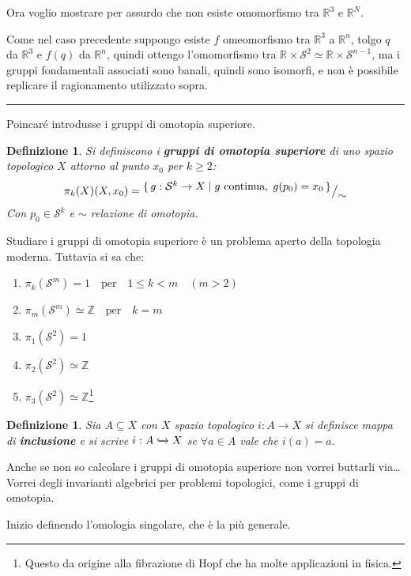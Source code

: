 \documentclass[10pt, twoside=false, x11names]{scrbook}
\newtheorem{definition}[theorem]{Definizione}
\newenvironment{proof}{{\textbf{Dimostrazione}:}}{\hfill\rule{2mm}{2mm} \newline}
\newcommand{\Z}{\mathbb{Z}}
\newcommand{\RN}[1][]{\mathbb{R}^#1}
\newcommand{\Sph}[1][]{\mathcal{S}^#1}
\newcommand{\incl}{\xhookrightarrow{}}
\newcommand*\quot[2]{{^{\textstyle #1}\big/_{\textstyle #2}}}
\begin{document}
Ora voglio mostrare per assurdo che non esiste omomorfismo tra $ \RN{3} $ e $ \RN{N} $.

\begin{proof}
  Come nel caso precedente suppongo esiste $ f $ omeomorfismo tra $ \RN{3} $ a $ \RN{n} $,
  tolgo $ q $ da $ \RN{3} $ e $ f(q) $ da $ \RN{n} $, quindi ottengo
  l'omomorfismo tra $ \RN{} \times \Sph{2} \simeq \RN{} \times \Sph{n-1} $, ma i gruppi fondamentali
  associati sono banali, quindi sono isomorfi, e non è possibile replicare il ragionamento utilizzato sopra.
\end{proof}

Poincaré introdusse i gruppi di omotopia superiore.

\begin{definition}
  Si definiscono i \textbf{gruppi di omotopia superiore} di uno spazio topologico $ X $
  attorno al punto $ x_0 $ per $ k \geq 2 $:
  \[
    \pi_k(X) (X, x_0) = \quot{\set{ g: \Sph{k} \to X | g \text{ continua}, \; g(p_0) = x_0}}{\sim}
  \]
  Con $ p_0 \in \Sph{k} $ e $ \sim $ relazione di omotopia.
\end{definition}
Studiare i gruppi di omotopia superiore è un problema aperto della topologia moderna.
Tuttavia si sa che:
\begin{enumerate}
\item $ \pi_k(\Sph{m}) = 1 \quad \text{per} \quad 1 \leq k < m \quad (m > 2)$
\item $ \pi_m(\Sph{m}) \simeq \Z \quad \text{per} \quad k = m $
\item $ \pi_1(\Sph{2}) = 1 $
\item $ \pi_2(\Sph{2}) \simeq \Z $
\item $ \pi_3(\Sph{2}) \simeq \Z $\footnote{Questo da origine alla fibrazione di Hopf che ha molte applicazioni in fisica.}
\end{enumerate}

\begin{definition}
  Sia $ A \subseteq X $ con $ X $ spazio topologico $ i: A \to X $ si definisce mappa di \textbf{inclusione}
  e si scrive $ i: A \incl X $ se $ \forall a \in A $ vale che $ i(a) = a $.
\end{definition}


Anche se non so calcolare i gruppi di omotopia superiore non vorrei buttarli via\dots
Vorrei degli invarianti algebrici per problemi topologici, come i gruppi di omotopia.

Inizio definendo l'omologia singolare, che è la più generale.
\end{document}
